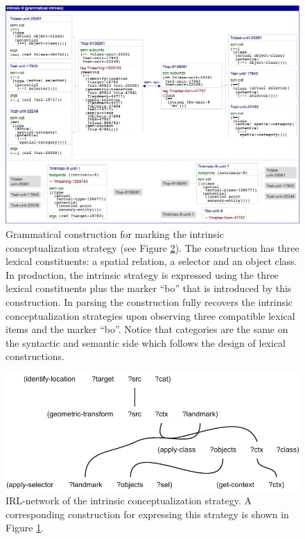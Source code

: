 \begin{figure}
\begin{center}
\includegraphics[width=0.98\columnwidth]{figs/bo-construction.png}
\end{center}
\caption[Example grammatical marker construction]{%
Grammatical construction for marking the intrinsic conceptualization strategy
(see Figure \ref{f:semantic-structure-grammar-intrinsic}). The construction
has three lexical constituents: a spatial relation, a selector and an object class. In production,
the intrinsic strategy is expressed using the three lexical constituents plus the marker ``bo''
that is introduced by this construction. In parsing the construction fully recovers
the intrinsic conceptualization strategies upon observing three compatible lexical items 
and the marker ``bo''.
Notice that categories are the same on the syntactic and semantic side 
which follows the design of lexical constructions.}
\label{f:bo-construction}
\end{figure}

\begin{figure}
\begin{center}
\includegraphics[width=0.9\columnwidth]{figs/semantic-structure-intrinsic-strategy-grammatical-marking}
\end{center}
\caption[Semantic structure intrinsic conceptualization strategy]{IRL-network of the intrinsic conceptualization strategy. A corresponding construction
for expressing this strategy is shown in Figure \ref{f:bo-construction}.}
\label{f:semantic-structure-grammar-intrinsic}
\end{figure}


